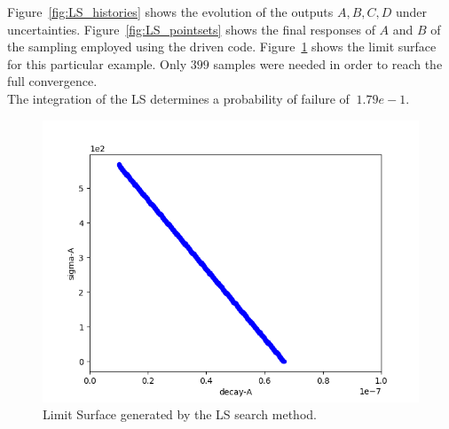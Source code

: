  Figure~\ref{fig:LS_histories}
 shows the evolution of the outputs $A,B,C,D$ under uncertainties.
 Figure~\ref{fig:LS_pointsets} shows the final responses  of $A$ and $B$
 of the sampling employed using the driven code.
 Figure~\ref{fig:LSplot}  shows the limit surface for this particular
 example. Only $399$ samples were needed in order to reach the full
 convergence.
 \\The integration of the LS determines a probability of failure of
 $~1.79e-1$.
 \begin{figure}[h!]
  \centering
  \includegraphics[scale=0.7]{../../tests/framework/user_guide/AdaptiveSamplingStrategies/gold/LSsearch/1-limitSurfacePlot_scatter.png}
  \caption{Limit Surface generated by the LS search method.}
  \label{fig:LSplot}
 \end{figure}








